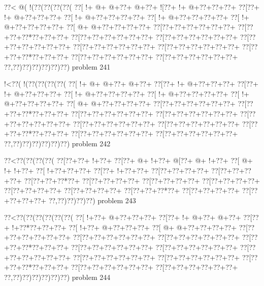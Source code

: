 \vbox{\vbox{\goo
\0??<\- @(\- !(\0??(\0??(\0??(\0??(
\0??[\- !+\- @+\- @+\0??+\- @+\0??+
\- ![\0??+\- !+\- @+\0??+\0??+\0??+
\0??[\0??+\- !+\- @+\0??+\0??+\0??+
\0??[\- !+\- @+\0??+\0??+\0??+\0??+
\0??[\- !+\- @+\0??+\0??+\0??+\0??+
\0??[\- !+\- @+\0??+\0??+\0??+\0??+
\0??[\- @+\- @+\0??+\0??+\0??+\0??+
\0??[\0??+\0??+\0??+\0??+\0??+\0??+
\0??[\0??+\0??+\0??*\0??+\0??+\0??+
\0??[\0??+\0??+\0??+\0??+\0??+\0??+
\0??[\0??+\0??+\0??+\0??+\0??+\0??+
\0??[\0??+\0??+\0??+\0??+\0??+\0??+
\0??[\0??+\0??+\0??+\0??+\0??+\0??+
\0??[\0??+\0??+\0??+\0??+\0??+\0??+
\0??[\0??+\0??+\0??*\0??+\0??+\0??+
\0??[\0??+\0??+\0??+\0??+\0??+\0??+
\0??[\0??+\0??+\0??+\0??+\0??+\0??+
\0??,\0??)\0??)\0??)\0??)\0??)\0??)
}
\hfil problem 241\hfil\break
}

\vbox{\vbox{\goo
\- !<\0??(\- !(\0??(\0??(\0??(\0??(
\0??[\- !+\- @+\- @+\0??+\- @+\0??+
\0??[\0??+\- !+\- @+\0??+\0??+\0??+
\0??[\0??+\- !+\- @+\0??+\0??+\0??+
\0??[\- !+\- @+\0??+\0??+\0??+\0??+
\0??[\- !+\- @+\0??+\0??+\0??+\0??+
\0??[\- !+\- @+\0??+\0??+\0??+\0??+
\0??[\- @+\- @+\0??+\0??+\0??+\0??+
\0??[\0??+\0??+\0??+\0??+\0??+\0??+
\0??[\0??+\0??+\0??*\0??+\0??+\0??+
\0??[\0??+\0??+\0??+\0??+\0??+\0??+
\0??[\0??+\0??+\0??+\0??+\0??+\0??+
\0??[\0??+\0??+\0??+\0??+\0??+\0??+
\0??[\0??+\0??+\0??+\0??+\0??+\0??+
\0??[\0??+\0??+\0??+\0??+\0??+\0??+
\0??[\0??+\0??+\0??*\0??+\0??+\0??+
\0??[\0??+\0??+\0??+\0??+\0??+\0??+
\0??[\0??+\0??+\0??+\0??+\0??+\0??+
\0??,\0??)\0??)\0??)\0??)\0??)\0??)
}
\hfil problem 242\hfil\break
}

\vbox{\vbox{\goo
\0??<\0??(\0??(\0??(\0??(
\0??[\0??+\0??+\- !+\0??+
\0??[\0??+\- @+\- !+\0??+
\- @[\0??+\- @+\- !+\0??+
\0??[\- @+\- !+\- !+\0??+
\0??[\- !+\0??+\0??+\0??+
\0??[\0??+\- !+\0??+\0??+
\0??[\0??+\0??+\0??+\0??+
\0??[\0??+\0??+\0??+\0??+
\0??[\0??+\0??+\0??*\0??+
\0??[\0??+\0??+\0??+\0??+
\0??[\0??+\0??+\0??+\0??+
\0??[\0??+\0??+\0??+\0??+
\0??[\0??+\0??+\0??+\0??+
\0??[\0??+\0??+\0??+\0??+
\0??[\0??+\0??+\0??*\0??+
\0??[\0??+\0??+\0??+\0??+
\0??[\0??+\0??+\0??+\0??+
\0??,\0??)\0??)\0??)\0??)
}
\hfil problem 243\hfil\break
}

\vbox{\vbox{\goo
\0??<\0??(\0??(\0??(\0??(\0??(\0??(
\0??[\- !+\0??+\- @+\0??+\0??+\0??+
\0??[\0??+\- !+\- @+\0??+\- @+\0??+
\0??[\0??+\- !+\0??*\0??+\0??+\0??+
\0??[\- !+\0??+\- @+\0??+\0??+\0??+
\0??[\- @+\- @+\0??+\0??+\0??+\0??+
\0??[\0??+\0??+\0??+\0??+\0??+\0??+
\0??[\0??+\0??+\0??+\0??+\0??+\0??+
\0??[\0??+\0??+\0??+\0??+\0??+\0??+
\0??[\0??+\0??+\0??*\0??+\0??+\0??+
\0??[\0??+\0??+\0??+\0??+\0??+\0??+
\0??[\0??+\0??+\0??+\0??+\0??+\0??+
\0??[\0??+\0??+\0??+\0??+\0??+\0??+
\0??[\0??+\0??+\0??+\0??+\0??+\0??+
\0??[\0??+\0??+\0??+\0??+\0??+\0??+
\0??[\0??+\0??+\0??*\0??+\0??+\0??+
\0??[\0??+\0??+\0??+\0??+\0??+\0??+
\0??[\0??+\0??+\0??+\0??+\0??+\0??+
\0??,\0??)\0??)\0??)\0??)\0??)\0??)
}
\hfil problem 244\hfil\break
}

